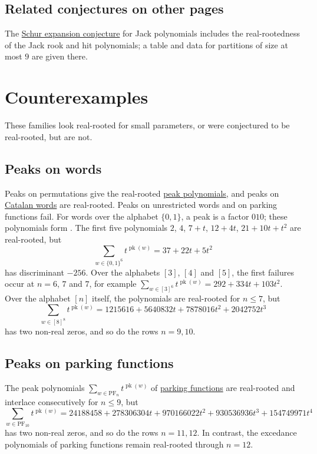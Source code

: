 \subsection[openProblemsElsewhere]{Related conjectures on other pages}

The \hyperref[jackSchurExpansionConjecture]{Schur expansion conjecture} for
Jack polynomials \cite{AlexanderssonHaglundWang2018} includes the
real-rootedness of the Jack rook and hit polynomials; a table and data for
partitions of size at most $9$ are given there.


\section[realRootedCounterexamples]{Counterexamples}

These families look real-rooted for small parameters, or were conjectured
to be real-rooted, but are not.

\subsection[counterexamplesWordPeaks]{Peaks on words}

Peaks on permutations give the real-rooted
\hyperref[peakGeneratingPolynomial]{peak polynomials}, and peaks on
\hyperref[conjCatalanWordPeaks]{Catalan words} are real-rooted.  Peaks on unrestricted words and on
parking functions fail.  For words over the alphabet $\{0,1\}$, a peak is a factor $010$; these
polynomials form .  The first five
polynomials $2$, $4$, $7+t$, $12+4t$, $21+10t+t^2$ are real-rooted, but
\[
  \sum_{w\in\{0,1\}^6}t^{\operatorname{pk}(w)}=37+22t+5t^2
\]
has discriminant $-256$.  Over the alphabets $[3]$, $[4]$ and $[5]$, the
first failures occur at $n=6$, $7$ and $7$, for example
$\sum_{w\in[3]^6}t^{\operatorname{pk}(w)}=292+334t+103t^2$.  Over the
alphabet $[n]$ itself, the polynomials are real-rooted for $n\leq7$, but
\[
  \sum_{w\in[8]^8}t^{\operatorname{pk}(w)}
  =1215616+5640832t+7878016t^2+2042752t^3
\]
has two non-real zeros, and so do the rows $n=9,10$.

\subsection[counterexamplesParkingPeaks]{Peaks on parking functions}

The peak polynomials $\sum_{w\in\mathrm{PF}_n}t^{\operatorname{pk}(w)}$ of
\hyperref[conjParkingExcedances]{parking functions} are real-rooted and
interlace consecutively for $n\leq9$, but
\[
  \sum_{w\in\mathrm{PF}_{10}}t^{\operatorname{pk}(w)}
  =24188458+278306304t+970166022t^2+930536936t^3+154749971t^4
\]
has two non-real zeros, and so do the rows $n=11,12$.  In contrast, the
excedance polynomials of parking functions remain real-rooted through
$n=12$.

